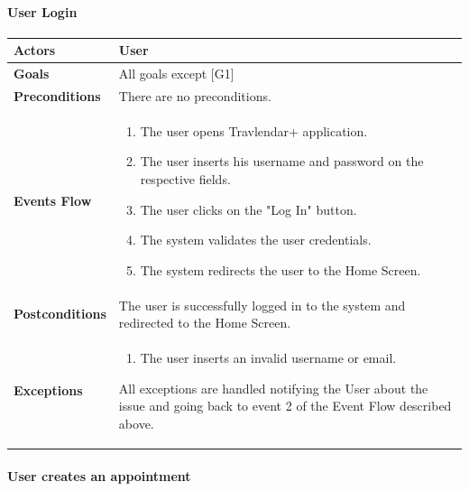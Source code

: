 \documentclass[12pt]{article}
\begin{document}
\newpage

\paragraph{User Login}
\begin{center}
    \begin{tabular} { |p{}|p{}| }
        \hline
        \textbf{Actors} & User \\ 
        \hline
        \textbf{Goals} & All goals except {[G1]} \\ 
        \hline  
        \textbf{Preconditions} & There are no preconditions. \\ 
        \hline
        \textbf{Events Flow} & \begin{enumerate}[topsep=0pt] 
                            \setlength{\itemsep}{0.5pt}
                            \item The user opens Travlendar+ application.
                            \item The user inserts his username and password on the respective fields.
                            \item The user clicks on the "Log In" button.
                            \item The system validates the user credentials.
                            \item The system redirects the user to the Home Screen.
                            \end{enumerate} \\
        \hline
        \textbf{Postconditions} & The user is successfully logged in to the system and redirected to the Home Screen. \\
        \hline
        \textbf{Exceptions} & \begin{enumerate}[topsep=0pt] 
                            \setlength{\itemsep}{0.5pt}
                            \item The user inserts an invalid username or email.
                            \end{enumerate} 
                            All exceptions are handled notifying the User about the issue and going back to event 2 of the Event Flow described above.\\ 
        \hline
    \end{tabular}
\end{center}

\newpage

\paragraph{User creates an appointment}
\end{document}
